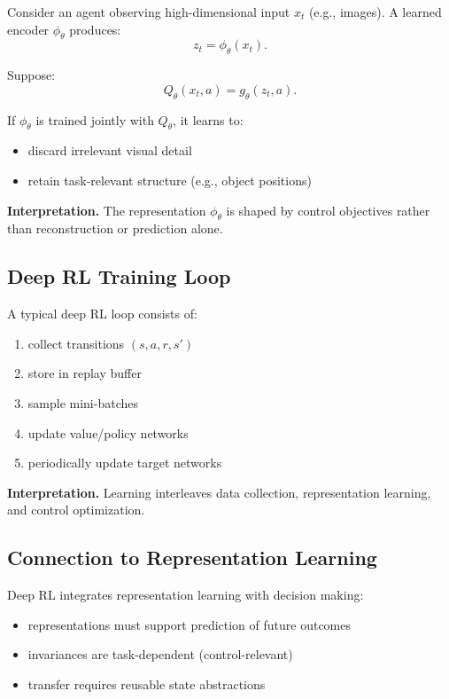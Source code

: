 Consider an agent observing high-dimensional input $x_t$ (e.g., images).  
A learned encoder $\phi_\theta$ produces:
\[
z_t = \phi_\theta(x_t).
\]

\medskip

Suppose:
\[
Q_\theta(x_t, a) = g_\theta(z_t, a).
\]

If $\phi_\theta$ is trained jointly with $Q_\theta$, it learns to:
\begin{itemize}
\item discard irrelevant visual detail
\item retain task-relevant structure (e.g., object positions)
\end{itemize}

\medskip

\noindent
\textbf{Interpretation.}  
The representation $\phi_\theta$ is shaped by control objectives rather than reconstruction or prediction alone.

\subsection{Deep RL Training Loop}

A typical deep RL loop consists of:
\begin{enumerate}
\item collect transitions $(s,a,r,s')$
\item store in replay buffer
\item sample mini-batches
\item update value/policy networks
\item periodically update target networks
\end{enumerate}

\medskip

\noindent
\textbf{Interpretation.}  
Learning interleaves data collection, representation learning, and control optimization.

\subsection{Connection to Representation Learning}

Deep RL integrates representation learning with decision making:
\begin{itemize}
\item representations must support prediction of future outcomes
\item invariances are task-dependent (control-relevant)
\item transfer requires reusable state abstractions
\end{itemize}

